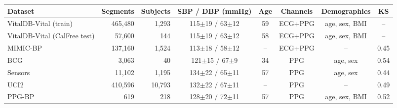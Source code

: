 \begin{tabular}{lrrccccc}
\toprule
Dataset & Segments & Subjects & SBP / DBP (mmHg) & Age & Channels & Demographics & KS \\
\midrule
VitalDB-Vital (train) & 465,480 & 1,293 & 115$\pm$19 / 63$\pm$12 & 59 & ECG+PPG & age, sex, BMI & -- \\
VitalDB-Vital (CalFree test) & 57,600 & 144 & 115$\pm$19 / 63$\pm$12 & 58 & ECG+PPG & age, sex, BMI & -- \\
MIMIC-BP & 137,160 & 1,524 & 113$\pm$18 / 58$\pm$12 & -- & ECG+PPG & -- & 0.45 \\
BCG & 3,063 & 40 & 121$\pm$15 / 67$\pm$9 & 34 & PPG & age, sex & 0.54 \\
Sensors & 11,102 & 1,195 & 134$\pm$22 / 65$\pm$11 & 57 & PPG & age, sex & 0.44 \\
UCI2 & 410,596 & 10,793 & 132$\pm$22 / 67$\pm$11 & -- & PPG & -- & 0.49 \\
PPG-BP & 619 & 218 & 128$\pm$20 / 72$\pm$11 & 57 & PPG & age, sex, BMI & 0.52 \\
\bottomrule
\end{tabular}